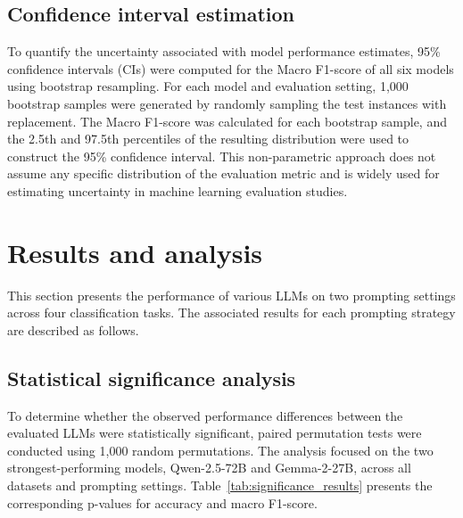 \documentclass[10pt,letterpaper]{article}
\begin{document}
\subsection*{Confidence interval estimation}
\label{sec:confidence_interval}

To quantify the uncertainty associated with model performance estimates, 95\% confidence intervals (CIs) were computed for the Macro F1-score of all six models using bootstrap resampling. For each model and evaluation setting, 1,000 bootstrap samples were generated by randomly sampling the test instances with replacement. The Macro F1-score was calculated for each bootstrap sample, and the 2.5th and 97.5th percentiles of the resulting distribution were used to construct the 95\% confidence interval. This non-parametric approach does not assume any specific distribution of the evaluation metric and is widely used for estimating uncertainty in machine learning evaluation studies.



\section*{Results and analysis}
\label{sec:results}

This section presents the performance of various LLMs on two prompting settings across four classification tasks. The associated results for each prompting strategy are described as follows.

\subsection*{Statistical significance analysis}

To determine whether the observed performance differences between the evaluated LLMs were statistically significant, paired permutation tests were conducted using 1,000 random permutations. The analysis focused on the two strongest-performing models, Qwen-2.5-72B and Gemma-2-27B, across all datasets and prompting settings. Table~\ref{tab:significance_results} presents the corresponding p-values for accuracy and macro F1-score.
\end{document}
